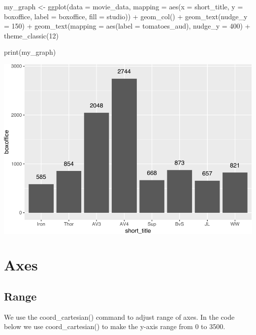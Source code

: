 \documentclass[
]{krantz}
\makeatletter
\newenvironment{Shaded}{\begin{snugshade}}{\end{snugshade}}
\newcommand{\AttributeTok}[1]{\textcolor[rgb]{0.61,0.61,0.61}{#1}}
\newcommand{\DecValTok}[1]{\textcolor[rgb]{0.06,0.06,0.06}{#1}}
\newcommand{\FunctionTok}[1]{\textcolor[rgb]{0,0,0}{#1}}
\newcommand{\NormalTok}[1]{#1}
\newcommand{\OtherTok}[1]{\textcolor[rgb]{0.37,0.37,0.37}{#1}}
\newcommand{\SpecialCharTok}[1]{\textcolor[rgb]{0,0,0}{#1}}
\newenvironment{kframe}{%
\medskip{}
\setlength{\fboxsep}{.8em}
 \def\at@end@of@kframe{}%
 \ifinner\ifhmode%
  \def\at@end@of@kframe{\end{minipage}}%
  \begin{minipage}{\columnwidth}%
 \fi\fi%
 \def\FrameCommand##1{\hskip\@totalleftmargin \hskip-\fboxsep
 \colorbox{shadecolor}{##1}\hskip-\fboxsep
     \hskip-\linewidth \hskip-\@totalleftmargin \hskip\columnwidth}%
 \MakeFramed {\advance\hsize-\width
   \@totalleftmargin\z@ \linewidth\hsize
   \@setminipage}}%
 {\par\unskip\endMakeFramed%
 \at@end@of@kframe}
\renewenvironment{Shaded}{\begin{kframe}}{\end{kframe}}
\makeatother
\begin{document}
\begin{Shaded}
\begin{Highlighting}[]
\NormalTok{my\_graph }\OtherTok{\textless{}{-}} \FunctionTok{ggplot}\NormalTok{(}\AttributeTok{data =}\NormalTok{ movie\_data,}
           \AttributeTok{mapping =} \FunctionTok{aes}\NormalTok{(}\AttributeTok{x =}\NormalTok{ short\_title,}
                         \AttributeTok{y =}\NormalTok{ boxoffice,}
                         \AttributeTok{label =}\NormalTok{ boxoffice, }
                         \AttributeTok{fill =}\NormalTok{ studio)) }\SpecialCharTok{+}
  \FunctionTok{geom\_col}\NormalTok{() }\SpecialCharTok{+}
  \FunctionTok{geom\_text}\NormalTok{(}\AttributeTok{nudge\_y =} \DecValTok{150}\NormalTok{)  }\SpecialCharTok{+}
  \FunctionTok{geom\_text}\NormalTok{(}\AttributeTok{mapping =} \FunctionTok{aes}\NormalTok{(}\AttributeTok{label =}\NormalTok{ tomatoes\_aud), }
            \AttributeTok{nudge\_y =} \DecValTok{400}\NormalTok{) }\SpecialCharTok{+}
  \FunctionTok{theme\_classic}\NormalTok{(}\DecValTok{12}\NormalTok{)}

\FunctionTok{print}\NormalTok{(my\_graph)}
\end{Highlighting}
\end{Shaded}

\includegraphics[width=0.65\linewidth]{bookdown_files/figure-latex/unnamed-chunk-108-1}

\hypertarget{axes}{%
\section{Axes}\label{axes}}

\hypertarget{range}{%
\subsection{Range}\label{range}}

We use the coord\_cartesian() command to adjust range of axes. In the code below we use coord\_cartesian() to make the y-axis range from 0 to 3500.
\end{document}
